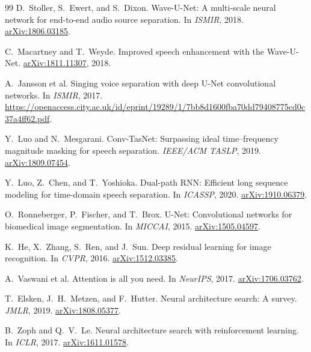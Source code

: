 \documentclass[10pt,twocolumn,letterpaper]{article}
\theoremstyle{remark}
\begin{document}
{\begin{thebibliography}{99}
D.~Stoller, S.~Ewert, and S.~Dixon.
\newblock Wave-U-Net: A multi-scale neural network for end-to-end audio source separation.
\newblock In \emph{ISMIR}, 2018.
\newblock \href{https://arxiv.org/abs/1806.03185}{arXiv:1806.03185}.

C.~Macartney and T.~Weyde.
\newblock Improved speech enhancement with the Wave-U-Net.
\newblock \href{https://arxiv.org/abs/1811.11307}{arXiv:1811.11307}, 2018.

A.~Jansson et al.
\newblock Singing voice separation with deep U-Net convolutional networks.
\newblock In \emph{ISMIR}, 2017.
\newblock \url{https://openaccess.city.ac.uk/id/eprint/19289/1/7bb8d1600fba70dd79408775cd0c37a4ff62.pdf}.

Y.~Luo and N.~Mesgarani.
\newblock Conv-TasNet: Surpassing ideal time--frequency magnitude masking for speech separation.
\newblock \emph{IEEE/ACM TASLP}, 2019.
\newblock \href{https://arxiv.org/abs/1809.07454}{arXiv:1809.07454}.

Y.~Luo, Z.~Chen, and T.~Yoshioka.
\newblock Dual-path RNN: Efficient long sequence modeling for time-domain speech separation.
\newblock In \emph{ICASSP}, 2020.
\newblock \href{https://arxiv.org/abs/1910.06379}{arXiv:1910.06379}.

O.~Ronneberger, P.~Fischer, and T.~Brox.
\newblock U-Net: Convolutional networks for biomedical image segmentation.
\newblock In \emph{MICCAI}, 2015.
\newblock \href{https://arxiv.org/abs/1505.04597}{arXiv:1505.04597}.

K.~He, X.~Zhang, S.~Ren, and J.~Sun.
\newblock Deep residual learning for image recognition.
\newblock In \emph{CVPR}, 2016.
\newblock \href{https://arxiv.org/abs/1512.03385}{arXiv:1512.03385}.

A.~Vaswani et al.
\newblock Attention is all you need.
\newblock In \emph{NeurIPS}, 2017.
\newblock \href{https://arxiv.org/abs/1706.03762}{arXiv:1706.03762}.

T.~Elsken, J.~H.~Metzen, and F.~Hutter.
\newblock Neural architecture search: A survey.
\newblock \emph{JMLR}, 2019.
\newblock \href{https://arxiv.org/abs/1808.05377}{arXiv:1808.05377}.

B.~Zoph and Q.~V.~Le.
\newblock Neural architecture search with reinforcement learning.
\newblock In \emph{ICLR}, 2017.
\newblock \href{https://arxiv.org/abs/1611.01578}{arXiv:1611.01578}.


\end{thebibliography}}
\end{document}
